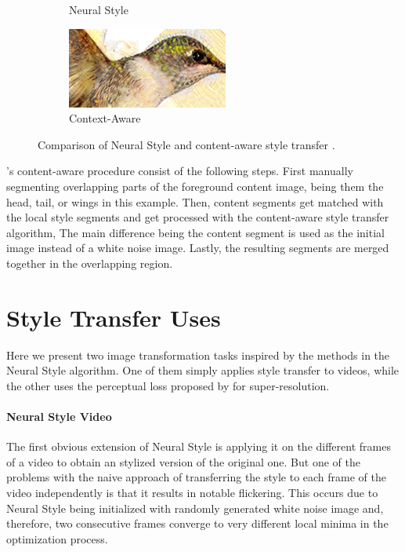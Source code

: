 \begin{figure}[t]
\begin{subfigure}[b]{0.244\textwidth}
    \caption{Neural Style}
  \end{subfigure}
  \begin{subfigure}[b]{0.244\textwidth}
    \includegraphics[width=\textwidth]{gfx/app-content-aware-8}
    \caption{Context-Aware}
  \end{subfigure}
  \caption{
    Comparison of Neural Style and content-aware style transfer \cite{Yin2016}.
  }
  \label{sec:applications:improvements:content-aware}
\end{figure}

\citeauthor{Yin2016}'s content-aware procedure consist of the following steps.
First manually segmenting overlapping parts of the foreground content image, being them the head, tail, or wings in this example.
Then, content segments get matched with the local style segments and get processed with the content-aware style transfer algorithm,
The main difference being the content segment is used as the initial image instead of a white noise image.
Lastly, the resulting segments are merged together in the overlapping region.



\section{Style Transfer Uses}
\label{sec:applications:uses}

Here we present two image transformation tasks inspired by the methods in the Neural Style algorithm.
One of them simply applies style transfer to videos, while the other uses the perceptual loss proposed by \citeauthor{Gatys2015B} for super-resolution.

\paragraph{Neural Style Video}
The first obvious extension of Neural Style is applying it on the different frames of a video to obtain an stylized version of the original one.
But one of the problems with the naive approach of transferring the style to each frame of the video independently is that it results in notable flickering.
This occurs due to Neural Style being initialized with randomly generated white noise image and, therefore, two consecutive frames converge to very different local minima in the optimization process.

